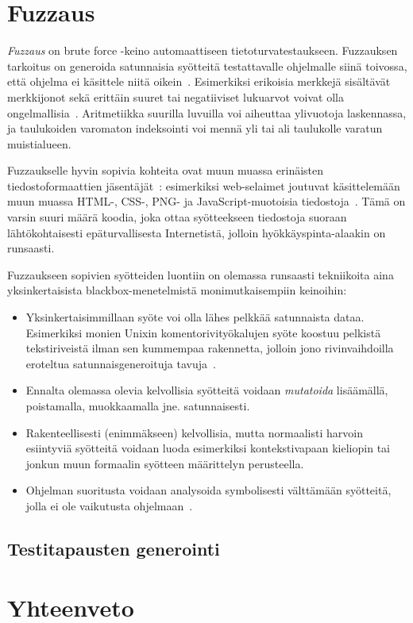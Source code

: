 \section{Fuzzaus}

\emph{Fuzzaus} on brute force -keino automaattiseen tietoturvatestaukseen.
Fuzzauksen tarkoitus on generoida satunnaisia syötteitä testattavalle ohjelmalle siinä toivossa,
että ohjelma ei käsittele niitä oikein~\cite{UnixReliability}.
Esimerkiksi erikoisia merkkejä sisältävät merkkijonot sekä erittäin suuret tai negatiiviset lukuarvot
voivat olla ongelmallisia~\cite{ViolatingAssumptions}.
Aritmetiikka suurilla luvuilla voi aiheuttaa ylivuotoja laskennassa,
ja taulukoiden varomaton indeksointi voi mennä yli tai ali taulukolle varatun muistialueen.

Fuzzaukselle hyvin sopivia kohteita ovat muun muassa erinäisten tiedostoformaattien jäsentäjät~\cite{SageArtikkeli,OuluBrowser}:
esimerkiksi web-selaimet joutuvat käsittelemään muun muassa
HTML-, CSS-, PNG- ja JavaScript-muotoisia tiedostoja~\cite{OuluBrowser}.
Tämä on varsin suuri määrä koodia,
joka ottaa syötteekseen tiedostoja suoraan lähtökohtaisesti epäturvallisesta Internetistä,
jolloin hyökkäyspinta-alaakin on runsaasti.

Fuzzaukseen sopivien syötteiden luontiin on olemassa runsaasti tekniikoita aina yksinkertaisista blackbox-menetelmistä monimutkaisempiin keinoihin:
\begin{itemize}
    \item Yksinkertaisimmillaan syöte voi olla lähes pelkkää satunnaista dataa.
          Esimerkiksi monien Unixin komentorivityökalujen syöte koostuu pelkistä tekstiriveistä ilman sen kummempaa rakennetta,
          jolloin jono rivinvaihdoilla eroteltua satunnaisgeneroituja tavuja~\cite{UnixReliability}.
    \item Ennalta olemassa olevia kelvollisia syötteitä voidaan \emph{mutatoida} lisäämällä, poistamalla, muokkaamalla jne. satunnaisesti.
    \item Rakenteellisesti (enimmäkseen) kelvollisia, mutta normaalisti harvoin esiintyviä syötteitä voidaan luoda esimerkiksi kontekstivapaan kieliopin tai jonkun muun formaalin syötteen määrittelyn perusteella.
    \item Ohjelman suoritusta voidaan analysoida symbolisesti välttämään syötteitä, jolla ei ole vaikutusta ohjelmaan~\cite{SageArtikkeli}.
\end{itemize}

\subsection{Testitapausten generointi}

\section{Yhteenveto}
